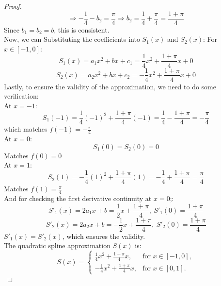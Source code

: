 \documentclass{article}
\begin{document}
\begin{proof}
    \[ \Rightarrow -\frac{1}{4} - b_2 = \frac{\pi}{4} \Longrightarrow b_2 = \frac{1}{4} + \frac{\pi}{4} = \frac{1 + \pi}{4} \]
    Since $b_1 = b_2 = b$, this is consistent.
    \\
    Now, we can Substituting the coefficients into $S_1(x)$ and $S_2(x)$:
    For $x \in [-1, 0]$:
    \[ S_1(x) = a_1x^2 + bx + c_1 = \frac{1}{4}x^2 + \frac{1 + \pi}{4}x + 0 \]
    \[ S_2(x) = a_2x^2 + bx + c_2 = -\frac{1}{4}x^2 + \frac{1 + \pi}{4}x + 0 \]
    Lastly, to ensure the validity of the approximation, we need to do some verification:
    \\
    At $x = -1$:
    \[ S_1(-1) = \frac{1}{4}(-1)^2 + \frac{1 + \pi}{4}(-1) = \frac{1}{4} - \frac{1 + \pi}{4} = -\frac{\pi}{4} \]
    which matches $f(-1) = -\frac{\pi}{4}$
    \\
    At $x = 0$:
    \[ S_1(0) = S_2(0) = 0 \]
    Matches $f(0) = 0$
    \\
    At $x = 1$:
    \[ S_2(1) = -\frac{1}{4}(1)^2 + \frac{1 + \pi}{4}(1) = -\frac{1}{4} + \frac{1 + \pi}{4} = \frac{\pi}{4} \]
    Matches $f(1) = \frac{\pi}{4}$
    \\
    And for checking the first derivative continuity at $x = 0$;:
    \[ S'_1(x) = 2a_1x + b = \frac{1}{2}x + \frac{1 + \pi}{4}, \ S'_1(0) = \frac{1 + \pi}{4} \]
    \[ S'_2(x) = 2a_2x + b = -\frac{1}{2}x + \frac{1 + \pi}{4}, \ S'_2(0) = \frac{1 + \pi}{4} \]
    $ S'_1(x) = S'_2(x) $, which ensures the validity.
    \\
    The quadratic spline approximation $S(x)$ is:
    \[ 
        S(x) = 
        \begin{cases} 
        \frac{1}{4}x^2 + \frac{1+\pi}{4}x, & \text{for } x \in [-1, 0], \\ 
        -\frac{1}{4}x^2 + \frac{1+\pi}{4}x, & \text{for } x \in [0, 1]. 
        \end{cases}
    \]
\end{proof}
\end{document}
